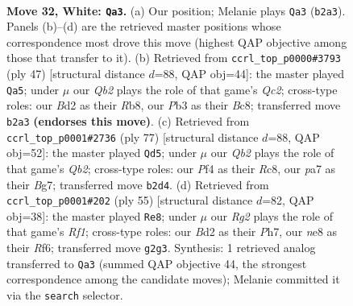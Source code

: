 \documentclass[11pt]{article}
\begin{document}
\clearpage

\begin{figure}[p]\centering
\begin{subfigure}{0.46\textwidth}\centering
\resizebox{\linewidth}{!}{%
\newchessgame
\chessboard[
  setfen={1r1rnk2/p1p5/5p2/2Pp1q1p/5P2/1P2P3/1Q1BK1RP/5BR1 w - - 0 32},
  showmover=false,
  pgfstyle=straightmove, color=movearrow, markmove={b2-a3}
]}
\caption{}
\end{subfigure}\hfill
\begin{subfigure}{0.46\textwidth}\centering
\resizebox{\linewidth}{!}{%
\newchessgame
\chessboard[
  setfen={1rb2r1k/2q3pp/p7/2P2p2/B1PQ4/8/P3pRPP/R5K1 b - - 1 24},
  showmover=false,
  pgfstyle=straightmove, color=movearrow, markmove={c7-a5}
]}
\caption{}
\end{subfigure}
\\[4pt]
\begin{subfigure}{0.46\textwidth}\centering
\resizebox{\linewidth}{!}{%
\newchessgame
\chessboard[
  setfen={2r1r1k1/1q4b1/6p1/6Np/4p2P/2p1P1PQ/2R2P2/2R3K1 b - - 0 39},
  showmover=false,
  pgfstyle=straightmove, color=movearrow, markmove={b7-d5}
]}
\caption{}
\end{subfigure}\hfill
\begin{subfigure}{0.46\textwidth}\centering
\resizebox{\linewidth}{!}{%
\newchessgame
\chessboard[
  setfen={5r1k/p1pq2bp/1p3r2/3Ppp2/2P5/1P2Q1P1/P3NR1P/3R3K b - - 5 28},
  showmover=false,
  pgfstyle=straightmove, color=movearrow, markmove={f8-e8}
]}
\caption{}
\end{subfigure}
\caption{\textbf{Move 32, White: \texttt{Qa3}.} (a) Our position; Melanie plays \texttt{Qa3} (\texttt{b2a3}). Panels (b)--(d) are the retrieved master positions whose correspondence most drove this move (highest QAP objective among those that transfer to it). (b) Retrieved from \texttt{ccrl\_top\_p0000\#3793} (ply 47) [structural distance $d$=88, QAP obj=44]: the master played \texttt{Qa5}; under $\mu$ our \emph{Qb2} plays the role of that game's \emph{Qc2}; cross-type roles: our \emph{B}d2 as their \emph{R}b8, our \emph{P}b3 as their \emph{B}c8; transferred move \texttt{b2a3} \textbf{(endorses this move)}. (c) Retrieved from \texttt{ccrl\_top\_p0001\#2736} (ply 77) [structural distance $d$=88, QAP obj=52]: the master played \texttt{Qd5}; under $\mu$ our \emph{Qb2} plays the role of that game's \emph{Qb2}; cross-type roles: our \emph{P}f4 as their \emph{R}c8, our \emph{p}a7 as their \emph{B}g7; transferred move \texttt{b2d4}. (d) Retrieved from \texttt{ccrl\_top\_p0001\#202} (ply 55) [structural distance $d$=82, QAP obj=38]: the master played \texttt{Re8}; under $\mu$ our \emph{Rg2} plays the role of that game's \emph{Rf1}; cross-type roles: our \emph{B}d2 as their \emph{P}h7, our \emph{n}e8 as their \emph{R}f6; transferred move \texttt{g2g3}. Synthesis: 1 retrieved analog transferred to \texttt{Qa3} (summed QAP objective 44, the strongest correspondence among the candidate moves); Melanie committed it via the \texttt{search} selector.}
\label{fig:thought-m62}
\end{figure}
\end{document}
